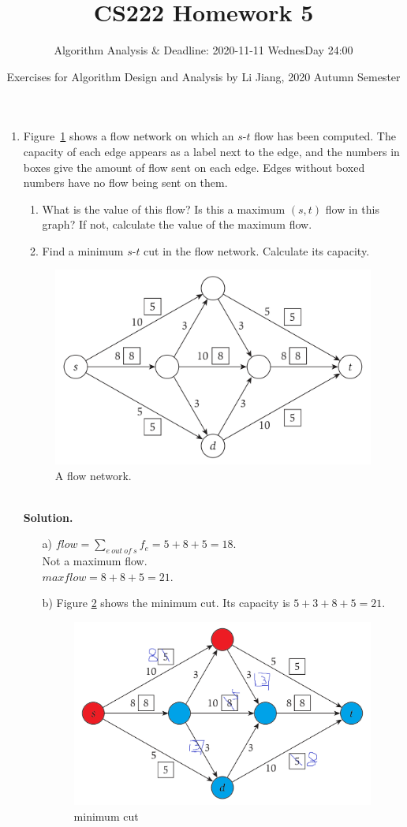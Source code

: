 \documentclass{article}
\title{CS222 Homework 5}
\author{Algorithm Analysis \& Deadline: 2020-11-11 WednesDay 24:00}
\date{Exercises for Algorithm Design and Analysis by Li Jiang, 2020 Autumn Semester}
\begin{document}
\maketitle

\begin{enumerate}


\item Figure~\ref{fig3} shows a flow network on which an $s$-$t$ flow has been computed. The capacity of each edge appears as a label next to the edge, and the numbers in boxes give the amount of flow sent on each edge. Edges without boxed numbers have no flow being sent on them.

\begin{enumerate}
    \item What is the value of this flow? Is this a maximum $(s, t)$ flow in this graph? If not, calculate the value of the maximum flow.
    \item Find a minimum $s$-$t$ cut in the flow network. Calculate its capacity.
\end{enumerate}

\begin{figure}[h]
    \centering
    \includegraphics[width=0.5\linewidth]{fig3.png}
    \caption{A flow network.}
    \label{fig3}
\end{figure}


~\\
\textbf{Solution.}\\
\begin{itemize}
\item [a)] $flow=\sum_{e\ out\ of\ s} f_e = 5+8+5=18$. \\ Not a maximum flow. \\ $maxflow=8+8+5=21$.
\item [b)] Figure \ref{fig4} shows the minimum cut. Its capacity is $5+3+8+5=21$. \begin{figure}[htb]\centering\includegraphics[width=0.5\linewidth]{fig4.png}\caption{minimum cut}\label{fig4}\end{figure}
\end{itemize}
~\\


\end{enumerate}
\end{document}
